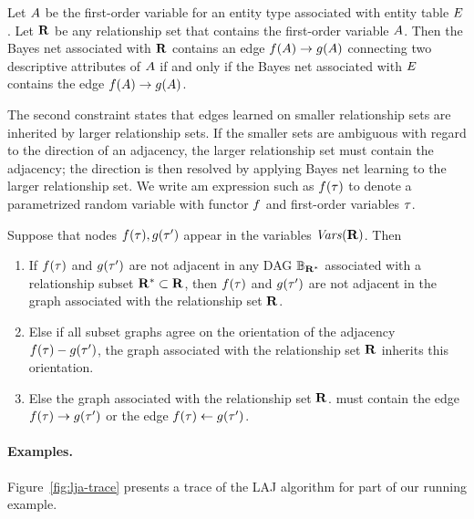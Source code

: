 \begin{constraint} \label{clause:econstraints} Let $A$ be the first-order variable for an entity type associated with entity table $E$. Let $\mathbf{R}$ be any relationship set that contains the first-order variable $A$. Then the Bayes net associated with $\mathbf{R}$ contains an edge $f(A) \rightarrow g(A)$ connecting two descriptive attributes of $A$ if and only if the Bayes net associated with $E$ contains the edge $f(A) \rightarrow g(A)$.
\end{constraint}

The second constraint states that edges learned on smaller relationship sets are inherited by larger relationship sets. If the smaller sets are ambiguous with regard to the direction of an adjacency, the larger relationship set must contain the adjacency; the direction is then resolved by applying Bayes net learning to the larger relationship set. We write am expression such as $f(\mathbf{\tau})$ to denote a parametrized  random variable with functor $f$ and first-order variables $\mathbf{\tau}$. 

\begin{constraint} \label{clause:rconstraints} Suppose that nodes $f(\mathbf{\tau}),g(\mathbf{\tau}')$ appear in the variables $\it{Vars}(\mathbf{R})$. %
Then
\begin{enumerate}
\item  If $f(\mathbf{\tau})$ and $g(\mathbf{\tau}')$ are not adjacent in any DAG $\mathbb{B}_{\mathbf{R}^{*}}$ associated with a relationship subset $\mathbf{R}^{*} \subset \mathbf{R}$, then $f(\mathbf{\tau})$ and $g(\mathbf{\tau}')$ are not adjacent in the graph associated with the relationship set $\mathbf{R}$.
\item Else if all subset graphs agree on the orientation of the adjacency  $f(\mathbf{\tau})-g(\mathbf{\tau}')$, the graph associated with the relationship set $\mathbf{R}$ inherits this orientation.
\item Else the graph associated with the relationship set $\mathbf{R}$. must contain the edge $f(\mathbf{\tau}) \rightarrow g(\mathbf{\tau}')$ or the edge $f(\mathbf{\tau}) \leftarrow g(\mathbf{\tau}')$.
\end{enumerate}
\end{constraint}

\paragraph{Examples.} Figure~\ref{fig:lja-trace} presents a trace of the LAJ algorithm for part of our running example.

